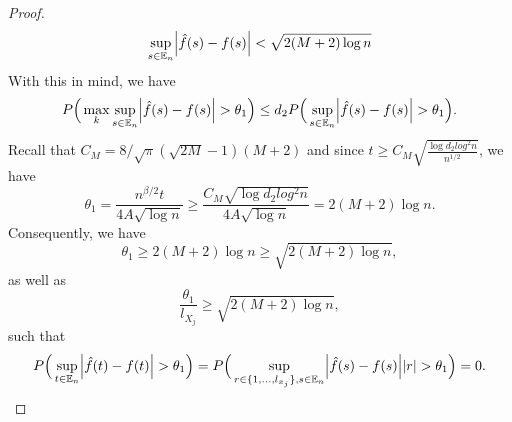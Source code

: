 \begin{lemma}
\begin{proof}
\begin{equation}
            \sup_{s \in \mathbb{E}_n}\abs{\hat{f}(s) - f(s)} < \sqrt{2 (M + 2) \log n}
        \end{equation}  
        With this in mind, we have
        \begin{equation*}
            P\Big(\max_k \sup_{s \in \mathbb{E}_n} \abs{\hat{f}(s) - f(s)} > \theta_1 \Big) \leq d_2 P\Big(\sup_{s \in \mathbb{E}_n} \abs{\hat{f}(s) - f(s)} > \theta_1 \Big).
        \end{equation*}
        Recall that $C_M = 8/\sqrt{\pi}(\sqrt{2M} -1)(M+2)$ and since $t \geq C_M\sqrt{\frac{\log d_2 log^2 n}{n^{1/2}}}$, we have
        \begin{equation*}
            \theta_1 = \frac{n^{\beta/2}t}{4A\sqrt{\log n}} \geq \frac{C_M \sqrt{\log d_2 log^2 n}}{4A\sqrt{\log n}} = 2(M + 2)\log n.
        \end{equation*}
        Consequently, we have 
        \begin{equation*}
            \theta_1 \geq 2(M + 2)\log n \geq \sqrt{2(M + 2)\log n},
        \end{equation*}
        as well as
        \begin{equation*}
            \frac{\theta_1}{l_{X_j}} \geq \sqrt{2(M + 2)\log n},
        \end{equation*}
        such that 
        \begin{equation*}
            P\Big(\sup_{t \in \mathbb{E}_n} \abs{\hat{f}(t) - f(t)} > \theta_1 \Big) = P\Big(\sup_{r \in \{1,\dots,l_{x_j}\}, s \in \mathbb{E}_n} \abs{\hat{f}(s) - f(s)}\abs{r} > \theta_1 \Big) = 0.
        \end{equation*}
        

\end{proof}
\end{lemma}
